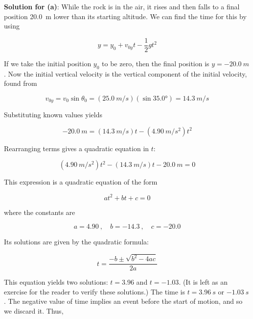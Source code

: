\documentclass[../../main-ap-physics.tex]{subfiles}
\begin{document}
\textbf{Solution for (a)}: While the rock is in the air, it rises and then falls to a final position \SI{20.0}{m} lower than its starting altitude. We can find the time for this by using

\begin{equation*}
    y = y_0 + v_{0y}t -\frac{1}{2} g t^2
\end{equation*}

If we take the initial position $y_0$ to be zero, then the final position is  $y = -\SI{20.0}{m}$. Now the initial vertical velocity is the vertical component of the initial velocity, found from 

\begin{equation*}
    v_{0y} = v_0 \sin{\theta_0} = \left(\SI{25.0}{m/s}\right) \left(\sin{\ang{35.0}}\right) = \SI{14.3}{m/s}
\end{equation*}

Substituting known values yields

\begin{equation*}
    -\SI{20.0}{m} = \left(\SI{14.3}{m/s}\right) t - \left(\SI{4.90}{m/s^2}\right) t^2
\end{equation*}

Rearranging terms gives a quadratic equation in $t$:

\begin{equation*}
    \left(\SI{4.90}{m/s^2}\right) t^2 - \left(\SI{14.3}{m/s}\right) t -\SI{20.0}{m} = 0
\end{equation*}

This expression is a quadratic equation of the form

\begin{equation*}
    at^2 + bt + c = 0
\end{equation*}

where the constants are 

\begin{equation*}
    a = 4.90\ ,\quad b = -14.3\ , \quad c = -20.0
\end{equation*}

Its solutions are given by the quadratic formula:

\begin{equation*}
    t = \frac{-b \pm \sqrt{b^2 - 4ac}}{2a}
\end{equation*}

This equation yields two solutions: $t = 3.96$ and $t = -1.03$. (It is left as an exercise for the reader to verify these solutions.) The time is $t = \SI{3.96}{s}$ or $-\SI{1.03}{s}$. The negative value of time implies an event before the start of motion, and so we discard it. Thus,
\end{document}
